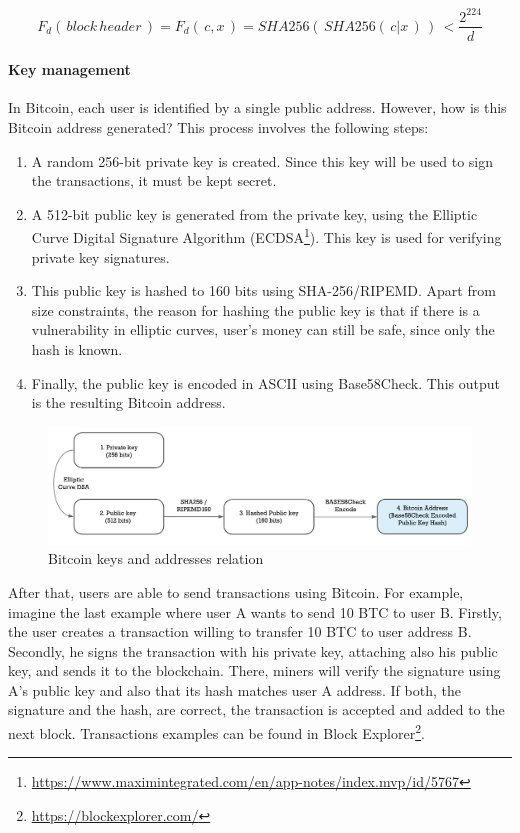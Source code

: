 $$ F_d( \, block \, header \,) = F_d( \,c,x \,) = SHA256( \, SHA256( \, c|x \,) \,)\, < \frac{2^{224}}{d}$$

\paragraph{Key management}

In Bitcoin, each user is identified by a single public address. However, how is this Bitcoin address generated? This process involves the following steps:

\begin{enumerate}
	
	\item A random 256-bit private key is created. Since this key will be used to sign the transactions, it must be kept secret.
	\item A 512-bit public key is generated from the private key, using the Elliptic Curve Digital Signature Algorithm (ECDSA\footnote{\url{https://www.maximintegrated.com/en/app-notes/index.mvp/id/5767}}). This key is used for verifying private key signatures.
	\item This public key is hashed to 160 bits using SHA-256/RIPEMD. Apart from size constraints, the reason for hashing the public key is that if there is a vulnerability in elliptic curves, user's money can still be safe, since only the hash is known.
	\item Finally, the public key is encoded in ASCII using Base58Check. This output is the resulting Bitcoin address.
	
\end{enumerate}

\begin{figure}[bth]
  \centering
  \includegraphics[width=0.9\linewidth]{gfx/bitkeys}    
  \caption{Bitcoin keys and addresses relation \citep{BitcoinKey2018}}
  \label{fig:EthereumAccounts}
\end{figure}

After that, users are able to send transactions using Bitcoin. For example, imagine the last example where user A wants to send 10 BTC to user B. Firstly, the user creates a transaction willing to transfer 10 BTC to user address B. Secondly, he signs the transaction with his private key, attaching also his public key, and sends it to the blockchain. There, miners will verify the signature using A's public key and also that its hash matches user A address. If both, the signature and the hash, are correct, the transaction is accepted and added to the next block. Transactions examples can be found in Block Explorer\footnote{\url{https://blockexplorer.com/}}.

